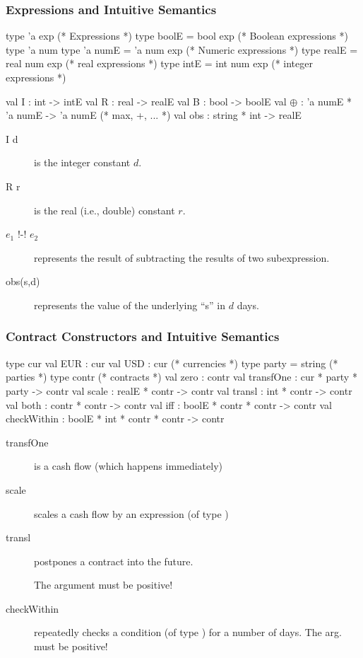 \documentclass[xcolor=dvipsnames,11pt]{beamer}
\renewcommand{\emph}[1]{\textcolor{structure!90}{#1}}
\begin{document}
\begin{frame}[fragile,t]
    \frametitle{Expressions and Intuitive Semantics}

\begin{mlcode}
  type 'a exp                     (* Expressions          *)
  type boolE = bool exp           (* Boolean expressions  *)
  type 'a num 
  type 'a numE = 'a num exp       (* Numeric expressions  *)
  type realE = real num exp       (*  real expressions    *)
  type intE = int num exp         (*  integer expressions *)
 
  val I   : int -> intE
  val R   : real -> realE
  val B   : bool -> boolE
  val $\oplus$  : 'a numE * 'a numE -> 'a numE  (* max, +, ... *)
  val obs : string * int -> realE
\end{mlcode}

\begin{description}
\item[I d] is the integer constant $d$.
\item[R r] is the real (i.e., double) constant $r$.
\item[$e_1$ !-! $e_2$] represents the result of subtracting the results of two subexpression.
\item[obs(s,d)] represents the value of the underlying ``s'' in $d$ days.
\end{description}

\end{frame}

\begin{frame}[fragile,t]
    \frametitle{Contract Constructors and Intuitive Semantics}

\begin{mlcode}
  type cur val EUR : cur val USD : cur    (* currencies *)
  type party = string                     (* parties *)
  type contr                              (* contracts *)
  val zero        : contr             
  val transfOne   : cur * party * party -> contr
  val scale       : realE * contr -> contr
  val transl      : int * contr -> contr
  val both        : contr * contr -> contr
  val iff         : boolE * contr * contr -> contr
  val checkWithin : boolE * int * contr * contr -> contr
\end{mlcode}

\begin{description}
\item[transfOne] is a cash flow (which happens immediately)
\item[scale] scales a cash flow by an expression (of type )
\item[transl] postpones a contract into the \emph{future}.

    The  argument must be positive!

\item[checkWithin] repeatedly checks a condition (of type ) for a number of days.
    The  arg. must be positive!
\end{description}
\end{frame}
\end{document}
